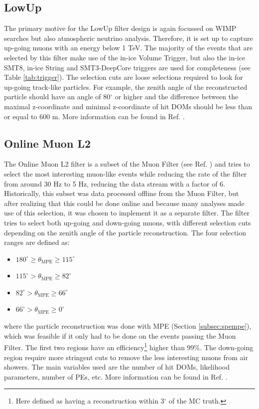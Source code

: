 
\subsection{LowUp}
The primary motive for the LowUp filter design is again focussed on WIMP searches but also atmospheric neutrino analysis. Therefore, it is set up to capture up-going muons with an energy below 1 TeV. The majority of the events that are selected by this filter make use of the in-ice Volume Trigger, but also the in-ice SMT8, in-ice String and SMT3-DeepCore triggers are used for completeness (see Table \ref{tab:trigger}). The selection cuts are loose selections required to look for up-going track-like particles. For example, the zenith angle of the reconstructed particle should have an angle of 80$^\circ$ or higher and the difference between the maximal z-coordinate and minimal z-coordinate of hit DOMs should be less than or equal to 600 m. More information can be found in Ref. \cite{LowUp2012}.


\subsection{Online Muon L2}
The Online Muon L2 filter is a subset of the Muon Filter (see Ref. \cite{muon2012filter}) and tries to select the most interesting muon-like events while reducing the rate of the filter from around 30 Hz to 5 Hz, reducing the data stream with a factor of 6. Historically, this subset was data processed offline from the Muon Filter, but after realizing that this could be done online and because many analyses made use of this selection, it was chosen to implement it as a separate filter. The filter tries to select both up-going and down-going muons, with different selection cuts depending on the zenith angle of the particle reconstruction. The four selection ranges are defined as:
\vspace{2mm}
\begin{itemize}
\item $180^\circ \geq \theta_\textrm{MPE} \geq 115^\circ$
\item $115^\circ > \theta_\textrm{MPE} \geq 82^\circ$
\item $82^\circ > \theta_\textrm{MPE} \geq 66^\circ$
\item $66^\circ > \theta_\textrm{MPE} \geq 0^\circ$
\end{itemize}
\vspace{2mm}
where the particle reconstruction was done with MPE (Section \ref{subsec:spempe}), which was feasible if it only had to be done on the events passing the Muon Filter. The first two regions have an efficiency\footnote{Here defined as having a reconstruction within 3$^\circ$ of the MC truth.} higher than 99\%. The down-going region require more stringent cuts to remove the less interesting muons from air showers. The main variables used are the number of hit DOMs, likelihood parameters, number of PEs, etc. More information can be found in Ref. \cite{OnlineMuonL22012}.

